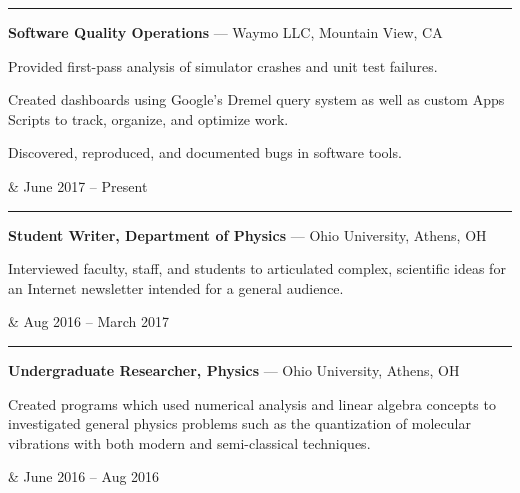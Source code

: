 \documentclass[10pt]{article}
\begin{document}
{\begin{tabular}
	\rule{-9pt}{0ex}\textbf{
	Software Quality Operations
	}{\color{gray} ---
	Waymo LLC, Mountain View, CA
	}
	\begin{description}
		{\color{darkgray}
		\item[\hspace{8pt} $\bullet$\hspace{3.5pt}]
		Provided first-pass analysis of simulator crashes and unit test failures.
		\item[\hspace{8pt} $\bullet$\hspace{3.5pt}]
		Created dashboards using Google’s Dremel query system as well as custom Apps Scripts to track, organize, and optimize work.
		\item[\hspace{8pt} $\bullet$\hspace{3.5pt}]
		Discovered, reproduced, and documented bugs in software tools.
		}
	\end{description} &
	June 2017 -- Present\\

	\rule{-9pt}{0ex}\textbf{
	Student Writer, Department of Physics
	}{\color{gray} ---
	Ohio University, Athens, OH
	}
	\begin{description}
		{\color{darkgray}
		\item[\hspace{8pt} $\bullet$\hspace{3.5pt}]
		Interviewed faculty, staff, and students to articulated complex, scientific ideas for an Internet newsletter intended for a general audience.
		}
	\end{description} &
	Aug 2016 -- March 2017\\

	\rule{-9pt}{0ex}\textbf{
	Undergraduate Researcher, Physics
	}{\color{gray} ---
	Ohio University, Athens, OH
	}
	\begin{description}
		{\color{darkgray}
		\item[\hspace{8pt} $\bullet$\hspace{4pt}]
		Created programs which used numerical analysis and linear algebra concepts to investigated general physics problems such as the quantization of molecular vibrations with both modern and semi-classical techniques.
		}
	\end{description} &
	June 2016 -- Aug 2016\\
\end{tabular}
}
\end{document}
